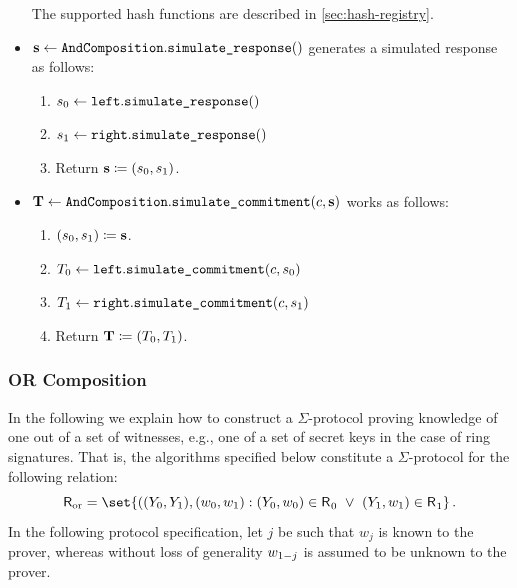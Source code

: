 \documentclass[11pt]{article}
\begin{document}
\begin{itemize}
\[   \]
   The supported hash functions are described in \cref{sec:hash-registry}.
  \item
  $\mathbf {s} \gets \texttt{AndComposition}.\texttt{simulate\_response}()$
   generates a simulated response as follows:
    \begin{enumerate}
      \item
        $s_0\gets\texttt{left}.\texttt{simulate\_response}()$
        \item $s_1\gets\texttt{right}.\texttt{simulate\_response}()$
      \item
        Return $\mathbf {s}\coloneqq(s_0,s_1)$.
    \end{enumerate}
  \item
  $\mathbf {T} \gets \texttt{AndComposition}.\texttt{simulate\_commitment}(c, \mathbf {s})$ works as follows:
    \begin{enumerate}
      \item
        $(s_0,s_1)\coloneqq\mathbf{s}$.
      \item
        $T_0\gets\texttt{left}.\texttt{simulate\_commitment}(c,s_0)$
        \item $T_1\gets\texttt{right}.\texttt{simulate\_commitment}(c,s_1)$
      \item
        Return $\mathbf {T}\coloneqq(T_0, T_1)$.
      \end{enumerate}
\end{itemize}



\subsubsection{OR Composition}

  In the following we explain how to construct a $\Sigma$-protocol proving knowledge of one out of a set of witnesses, e.g., one of a set of secret keys in the case of ring signatures.
  That is, the algorithms specified below constitute a $\Sigma$-protocol for the following relation:
\[
  \relation[or] = \set{
    ((\statement_0,\statement_1),(\witness_0,\witness_1) :
    (\statement_0,\witness_0)\in \relation_0 ~\lor~ (\statement_1,\witness_1)\in\relation_1}\,.
\]
  In the following protocol specification, let $j$ be such that $w_j$ is known to the prover, whereas without loss of generality $w_{1-j}$ is assumed to be unknown to the prover.
\end{document}
